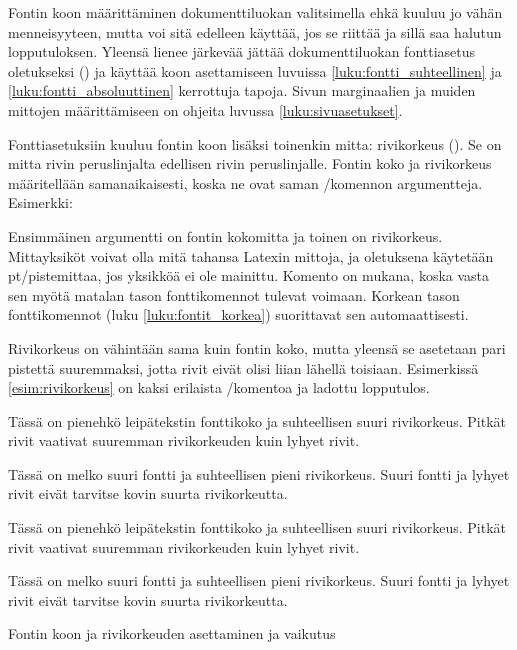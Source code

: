 Fontin koon määrittäminen dokumenttiluokan valitsimella ehkä kuuluu jo
vähän menneisyyteen, mutta voi sitä edelleen käyttää, jos se riittää ja
sillä saa halutun lopputuloksen. Yleensä lienee järkevää jättää
dokumenttiluokan fonttiasetus oletukseksi (\koodi{10pt}) ja käyttää koon
asettamiseen luvuissa \ref{luku:fontti_suhteellinen} ja
\ref{luku:fontti_absoluuttinen} kerrottuja tapoja. Sivun marginaalien ja
muiden mittojen määrittämiseen on ohjeita luvussa
\ref{luku:sivuasetukset}.

Fonttiasetuksiin kuuluu fontin koon lisäksi toinenkin mitta: rivikorkeus
(). Se on mitta rivin peruslinjalta edellisen
rivin peruslinjalle. Fontin koko ja rivikorkeus määritellään
saman\-aikaisesti, koska ne ovat saman \-/komennon
argumentteja. Esimerkki:

\begin{koodilohkosis}
  \fontsize{10bp}{12bp} \selectfont
\end{koodilohkosis}

Ensimmäinen argumentti on fontin kokomitta ja toinen on rivikorkeus.
Mitta\-yksiköt voivat olla mitä tahansa Latexin mittoja, ja oletuksena
käytetään pt\-/pistemittaa, jos yksikköä ei ole mainittu. Komento
 on mukana, koska vasta sen myötä matalan tason
fonttikomennot tulevat voimaan. Korkean tason fonttikomennot (luku
\ref{luku:fontit_korkea}) suorittavat sen automaattisesti.

Rivikorkeus on vähintään sama kuin fontin koko, mutta yleensä se
asetetaan pari pistettä suuremmaksi, jotta rivit eivät olisi liian
lähellä toisiaan. Esimerkissä \ref{esim:rivikorkeus} on kaksi erilaista
\-/komentoa ja ladottu lopputulos.

\begin{esimerkki*}
\begin{koodilohko}
  \fontsize{8bp}{11bp}\selectfont Tässä on pienehkö leipätekstin
  fonttikoko ja suhteellisen suuri rivikorkeus. Pitkät rivit vaativat
  suuremman rivikorkeuden kuin lyhyet rivit.

  \fontsize{16bp}{17bp}\selectfont Tässä on melko suuri fontti ja
  suhteellisen pieni rivikorkeus. Suuri fontti ja lyhyet rivit eivät
  tarvitse kovin suurta rivikorkeutta.
\end{koodilohko}
\parbox{\linewidth}{%
  \linespread{1}
  \fontsize{8bp}{11bp}\selectfont Tässä on pienehkö leipätekstin
  fonttikoko ja suhteellisen suuri rivikorkeus. Pitkät rivit vaativat
  suuremman rivikorkeuden kuin lyhyet rivit.

  \fontsize{16bp}{17bp}\selectfont Tässä on melko suuri fontti ja
  suhteellisen pieni rivikorkeus. Suuri fontti ja lyhyet rivit eivät
  tarvitse kovin suurta rivikorkeutta. }

\vspace{1ex}
\hrulefill
\vspace{2ex}

\caption{Fontin koon ja rivikorkeuden asettaminen ja vaikutus}
\label{esim:rivikorkeus}
\end{esimerkki*}

